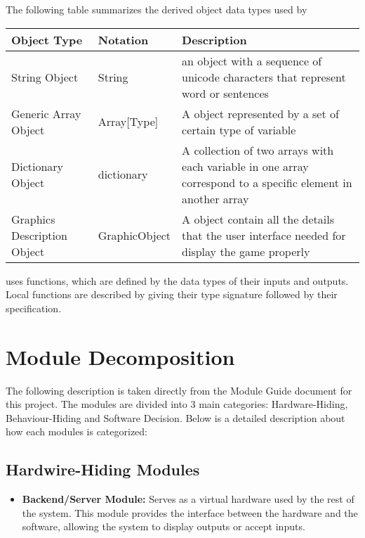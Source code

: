 \documentclass[12pt, titlepage]{article}
\begin{document}
The following table summarizes the derived object data types used by 

\begin{center}
\renewcommand{\arraystretch}{1.2}
\noindent 
\begin{tabular}{l l p{7.5cm}} 
\toprule 
\textbf{Object Type} & \textbf{Notation} & \textbf{Description}\\ 
\midrule
String Object & String & an object with a sequence of unicode characters that represent word or sentences\\
Generic Array Object & Array[Type] & A object represented by a set of certain type of variable \\
Dictionary Object & dictionary & A collection of two arrays with each variable in one array correspond to a specific element in another array\\
Graphics Description Object & GraphicObject & A object contain all the details that the user interface needed for display the game properly\\
\bottomrule
\end{tabular} 
\end{center}



\noindent
{} uses functions, which
are defined by the data types of their inputs and outputs. Local functions are
described by giving their type signature followed by their specification.

\section{Module Decomposition}

The following description is taken directly from the Module Guide document for this project. The modules are divided into 3 main categories: Hardware-Hiding, Behaviour-Hiding and Software Decision. Below is a detailed description about how each modules is categorized:

\subsection{Hardwire-Hiding Modules}

\begin{itemize}
\item \textbf{Backend/Server Module:} Serves as a virtual hardware used by the rest of the system. This module provides the interface between the hardware and the software, allowing the system to display
outputs or accept inputs.
\end{itemize}
\end{document}
